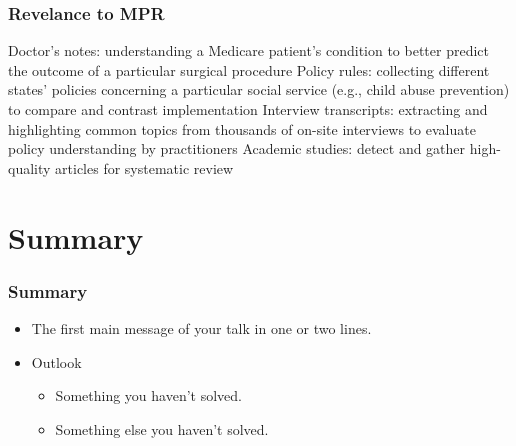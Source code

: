 \documentclass[smaller,xcolor=table,aspectratio=169]{beamer}
\begin{document}
\begin{frame}
  \frametitle{Revelance to MPR}
  Doctor's notes:  understanding a Medicare patient's condition to better predict the outcome of a particular surgical procedure
  Policy rules:  collecting different states' policies concerning a particular social service (e.g., child abuse prevention) to compare and contrast implementation
  Interview transcripts:  extracting and highlighting common topics from thousands of on-site interviews to evaluate policy understanding by practitioners
  Academic studies:  detect and gather high-quality articles for systematic review
\end{frame}

\begin{frame}

\end{frame}

\section*{Summary}

\begin{frame}
\frametitle<presentation>{Summary}

\begin{itemize}
  \item The \alert{first main message} of your talk in one or two lines.
\end{itemize}

\vfill
\begin{itemize}
  \item Outlook
  \begin{itemize}
    \item Something you haven't solved.
    \item Something else you haven't solved.
  \end{itemize}
\end{itemize}
\vfill
\end{frame}
\end{document}
